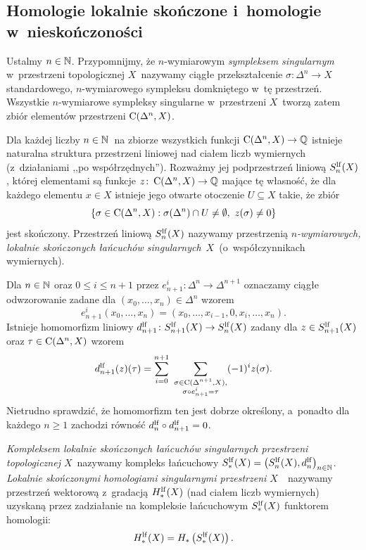 



\subsection{Homologie lokalnie skończone i~homologie w~nieskończoności}
Ustalmy $n\in \mathbb{N}$. Przypomnijmy, że \mbox{$n$-wymiarowym} \textit{sympleksem singularnym} w~przestrzeni topologicznej $X$~nazywamy ciągłe przekształcenie $\sigma\colon \Delta^n\to X$ standardowego, $n$-wymiarowego sympleksu domkniętego w~tę przestrzeń. Wszystkie $n$-wymiarowe sympleksy singularne w~przestrzeni $X$~tworzą zatem zbiór elementów przestrzeni $\operatorname{C}(\Delta^n,X)$.

Dla każdej liczby $n\in\mathbb{N}$~na zbiorze wszystkich funkcji $\operatorname{C}(\Delta^n,X)\to \mathbb{Q}$ istnieje naturalna struktura przestrzeni liniowej nad ciałem liczb wymiernych (z~działaniami ,,po współrzędnych''). Rozważmy jej podprzestrzeń liniową $S^{\mathrm{lf}}_n(X)$, której elementami są funkcje $z\colon \operatorname{C}(\Delta^n,X)\to \mathbb{Q}$ mające tę własność, że dla każdego elementu $x\in X$ istnieje jego otwarte otoczenie $U\subseteq X$ takie, że zbiór \[\left\{\sigma\in \Cont(\Delta^n,X): \sigma(\Delta^n)\cap U\not=\emptyset,\ z(\sigma)\not=0\right\}\] jest skończony. Przestrzeń liniową $S^{\mathrm{lf}}_n(X)$ nazywamy przestrzenią \textit{\mbox{$n$-wymiarowych}, lokalnie skończonych łańcuchów singularnych}~$X$~(o~współczynnikach wymiernych).

Dla $n\in \mathbb{N}$ oraz $0\leq i\leq n+1$ przez $e^i_{n+1}\colon \Delta^n\to \Delta^{n+1}$ oznaczamy ciągłe odwzorowanie zadane dla $(x_0,\ldots,x_n)\in \Delta^n$ wzorem \[e^i_{n+1}(x_0,\ldots,x_n)=(x_0,\ldots,x_{i-1},0,x_{i},\ldots,x_{n}).\] Istnieje homomorfizm liniowy $d_{n+1}^{\mathrm{lf}}\colon S^{\mathrm{lf}}_{n+1}(X)\to S^{\mathrm{lf}}_n(X)$ zadany dla $z\in S^{\mathrm{lf}}_{n+1}(X)$ oraz $\tau\in \operatorname{C}(\Delta^n,X)$ wzorem 
\[d_{n+1}^\lf(z)(\tau)=\sum_{i=0}^{n+1}\ \sum_{\substack{\sigma\in \Cont(\Delta^{n+1},X),\\ \sigma \circ e^i_{n+1}=\tau}} (-1)^i z(\sigma).\] Nietrudno sprawdzić, że homomorfizm ten jest dobrze określony, a~ponadto dla każdego $n\geq 1$ zachodzi równość $d^{\mathrm{lf}}_n\circ d^{\mathrm{lf}}_{n+1}=0$. 

\textit{Kompleksem lokalnie skończonych łańcuchów singularnych przestrzeni topologicznej $X$}~nazywamy kompleks łańcuchowy $S^{\mathrm{lf}}_*(X)=\left(S^{\mathrm{lf}}_n(X),d^{\mathrm{lf}}_n\right)_{n\in\mathbb{N}}$. \textit{Lokalnie skończonymi homologiami singularnymi przestrzeni $X$}~\cite[Definition 3.1]{Hughes96}~nazywamy przestrzeń wektorową z~gradacją $H_*^{\mathrm{lf}}(X)$ (nad ciałem liczb wymiernych) uzyskaną przez zadziałanie na kompleksie łańcuchowym $S_*^{\mathrm{lf}}(X)$ funktorem homologii: \[H_*^{\mathrm{lf}}(X)=H_*\left(S_*^{\mathrm{lf}}(X)\right).\]

